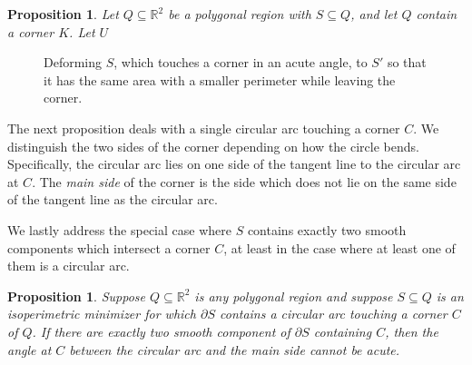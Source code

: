 \documentclass[leqno]{article}
\numberwithin{equation}{section}
\theoremstyle{definition}
\theoremstyle{remark}
\theoremstyle{plain}
\newtheorem{proposition}[equation]{Proposition}
\begin{document}
\begin{proposition}
    Let $Q \subseteq \mathbb{R}^2$ be a polygonal region with $S \subseteq Q$, and let $Q$ contain a corner $K$. Let $U$
\end{proposition}

\begin{figure}
    \centering
    \caption{Deforming $S$, which touches a corner in an acute angle, to $S'$ so that it has the same area with a smaller perimeter while leaving the corner.}
    \label{fig:acuteCornerDeform}
\end{figure}


The next proposition deals with a single circular arc touching a corner $C$.  We distinguish the two sides of the corner depending on how the circle bends.  Specifically, the circular arc lies on one side of the tangent line to the circular arc at $C$.  The \textit{main side} of the corner is the side which does not lie on the same side of the tangent line as the circular arc.


We lastly address the special case where $S$ contains exactly two smooth components which intersect a corner $C$, at least in the case where at least one of them is a circular arc.

\begin{proposition}\label{prop:twocorners}Suppose $Q\subseteq \mathbb{R}^2$ is any polygonal region and suppose $S\subseteq Q$ is an isoperimetric minimizer for which $\partial S$ contains a circular arc touching a corner $C$ of $Q$.  If there are exactly two smooth component of $\partial S$ containing $C$, then the angle at $C$ between the circular arc and the main side cannot be acute.

\end{proposition}
\end{document}
